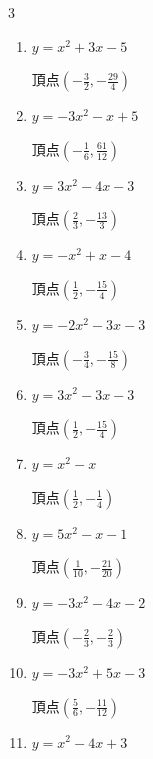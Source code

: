 \begin{multicols}{3}
\begin{enumerate}
        $\displaystyle 頂点\left( -\frac{5}{4} , -\frac{15}{8} \right)$

  \item $\displaystyle y=x^{2}+3x-5$

        $\displaystyle 頂点\left( -\frac{3}{2} , -\frac{29}{4} \right)$

  \item $\displaystyle y=-3x^{2}-x+5$

        $\displaystyle 頂点\left( -\frac{1}{6} , \frac{61}{12} \right)$

  \item $\displaystyle y=3x^{2}-4x-3$

        $\displaystyle 頂点\left( \frac{2}{3} , -\frac{13}{3} \right)$

\columnbreak %

  \item $\displaystyle y=-x^{2}+x-4$

        $\displaystyle 頂点\left( \frac{1}{2} , -\frac{15}{4} \right)$

  \item $\displaystyle y=-2x^{2}-3x-3$

        $\displaystyle 頂点\left( -\frac{3}{4} , -\frac{15}{8} \right)$

  \item $\displaystyle y=3x^{2}-3x-3$

        $\displaystyle 頂点\left( \frac{1}{2} , -\frac{15}{4} \right)$

  \item $\displaystyle y=x^{2}-x$

        $\displaystyle 頂点\left( \frac{1}{2} , -\frac{1}{4} \right)$

  \item $\displaystyle y=5x^{2}-x-1$

        $\displaystyle 頂点\left( \frac{1}{10} , -\frac{21}{20} \right)$

\columnbreak %

\resetques

  \item $\displaystyle y=-3x^{2}-4x-2$

        $\displaystyle 頂点\left( -\frac{2}{3} , -\frac{2}{3} \right)$

  \item $\displaystyle y=-3x^{2}+5x-3$

        $\displaystyle 頂点\left( \frac{5}{6} , -\frac{11}{12} \right)$

  \item $\displaystyle y=x^{2}-4x+3$


\end{enumerate}
\end{multicols}

